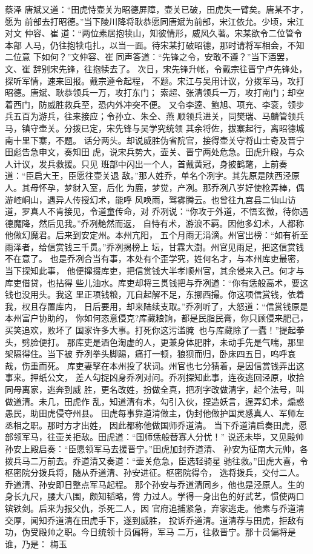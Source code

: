 蔡泽
唐斌又道：“田虎恃壶关为昭德屏障，壶关已破，田虎失一臂矣。唐某不才，愿为
前部去打昭德。”当下陵川降将耿恭愿同唐斌为前部，宋江依允。少顷，宋江对文
仲容、崔道：“两位素居抱犊山，知彼情形，威风久著。宋某欲令二位管令本部
人马，仍往抱犊屯扎，以当一面。待宋某打破昭德，那时请将军相会，不知二位意
下如何？”文仲容、崔同声答道：“先锋之令，安敢不遵？”当下酒罢，文、崔
辞别宋先锋，往抱犊去了。
次日，宋先锋升帐，令戴宗往晋宁卢先锋处，探听军情，速来回报。戴宗遵令起程，
不题。宋江与吴用计议，分拨军马，攻打昭德。唐斌、耿恭领兵一万，攻打东门；
索超、张清领兵一万，攻打南门；却空着西门，防威胜救兵至，恐内外冲突不便。
又令李逵、鲍旭、项充、李衮，领步兵五百为游兵，往来接应；令孙立、朱仝、燕
顺领兵进关，同樊瑞、马麟管领兵马，镇守壶关。分拨已定，宋先锋与吴学究统领
其余将佐，拔寨起行，离昭德城南十里下寨，不题。
话分两头。却说威胜伪省院官，接得壶关守将山士奇及晋宁田彪告急申文，奏知田
虎，说宋兵势大，壶关、晋宁两处危急。田虎升殿，与众人计议，发兵救援。只见
班部中闪出一个人，首戴黄冠，身披鹤氅，上前奏道：“臣启大王，臣愿往壶关退
敌。”那人姓乔，单名个冽字。其先原是陕西泾原人。其母怀孕，梦豺入室，后化
为鹿，梦觉，产冽。那乔冽八岁好使枪弄棒，偶游崆峒山，遇异人传授幻术，能呼
风唤雨，驾雾腾云。也曾往九宫县二仙山访道，罗真人不肯接见，令道童传命，对
乔冽说：“你攻于外道，不悟玄微，待你遇德魔降，然后见我。”乔冽艴然而返，
自恃有术，游浪不羁。因他多幻术，人都称他做幻魔君。后来到安定州。本州亢阳，
五个月雨无涓滴。州官出榜：“如有祈至雨泽者，给信赏钱三千贯。”乔冽揭榜上
坛，甘霖大澍。州官见雨足，把这信赏钱不在意了。
也是乔冽合当有事，本处有个歪学究，姓何名才，与本州库吏最密，当下探知此事，
他便撺掇库吏，把信赏钱大半孝顺州官，其余侵来入己。何才与库吏借贷，也拈得
些儿油水。库吏却将三贯钱把与乔冽道：“你有恁般高术，要这钱也没用头。我这
里正项钱粮，兀自起解不足，东挪西撮。你这项信赏钱，依着我，权且存置库内，
日后要用，却来陆续支取。”乔冽听了，大怒道：“信赏钱原是本州富户协助的，
你如何恣意侵克?库藏粮饷，都是民脂民膏，你只顾侵来肥己，买笑追欢，败坏了
国家许多大事。打死你这污滥腌，也与库藏除了一蠹！”提起拳头，劈脸便打。
那库吏是酒色淘虚的人，更兼身体肥胖，未动手先是气喘，那里架隔得住。当下被
乔冽拳头脚踢，痛打一顿，狼狈而归，卧床四五日，呜呼哀哉，伤重而死。
库吏妻孥在本州投了状词。州官也七分猜着，是因信赏钱弄出这事来。押纸公文，
差人勾捉凶身乔冽对问。乔冽探知此事，连夜逃回泾原，收拾同母离家，逃奔到威
胜，更名改姓，扮做全真，把冽字改做清字，起个法号，叫做道清。未几，田虎作
乱，知道清有术，勾引入伙，捏造妖言，逞弄幻术，煽惑愚民，助田虎侵夺州县。
田虎每事靠道清做主，伪封他做护国灵感真人、军师左丞相之职。那时方才出姓，
因此都称他做国师乔道清。
当下乔道清启奏田虎，愿部领军马，往壶关拒敌。田虎道：“国师恁般替寡人分忧！”
说还未毕，又见殿帅孙安上殿启奏：“臣愿领军马去援晋宁。”田虎加封乔道清、
孙安为征南大元帅，各拨兵马二万前去。乔道清又奏道：“壶关危急，臣选轻骑星
驰往救。”田虎大喜，令枢密院分拨兵将，随从乔道清、孙安进征。枢密院得令，
选将拨兵，交付二人。乔道清、孙安即日整点军马起程。
那个孙安与乔道清同乡，他也是泾原人。生的身长九尺，腰大八围，颇知韬略，膂
力过人。学得一身出色的好武艺，惯使两口镔铁剑。后来为报父仇，杀死二人，因
官府追捕紧急，弃家逃走。他素与乔道清交厚，闻知乔道清在田虎手下，遂到威胜，
投诉乔道清。道清荐与田虎，拒敌有功，伪受殿帅之职。今日统领十员偏将，军马
二万，往救晋宁。那十员偏将是谁，乃是：
梅玉


